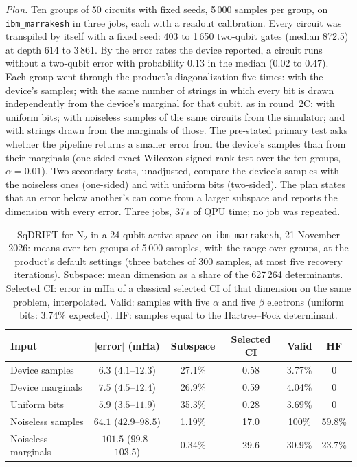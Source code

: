 \documentclass[11pt,a4paper]{article}
\begin{document}
\emph{Plan.} Ten groups of 50 circuits with fixed seeds, 5\,000 samples per
group, on \texttt{ibm\_marrakesh} in three jobs, each with a readout
calibration. Every circuit was transpiled by itself with a fixed seed: 403
to 1\,650 two-qubit gates (median 872.5) at depth 614 to 3\,861. By the error
rates the device reported, a circuit runs without a two-qubit error with
probability $0.13$ in the median ($0.02$ to $0.47$). Each group went
through the product's diagonalization five times: with the device's samples;
with the same number of strings in which every bit is drawn independently
from the device's marginal for that qubit, as in round~2C; with uniform
bits; with noiseless samples of the same circuits from the simulator; and
with strings drawn from the marginals of those. The pre-stated primary test
asks whether the pipeline returns a smaller error from the device's samples
than from their marginals (one-sided exact Wilcoxon signed-rank test over
the ten groups, $\alpha = 0.01$). Two secondary tests, unadjusted, compare
the device's samples with the noiseless ones (one-sided) and with uniform
bits (two-sided). The plan states that an error below another's can come
from a larger subspace and reports the dimension with every error. Three
jobs, 37\,s of QPU time; no job was repeated.

\begin{table}[H]
\centering\footnotesize\setlength{\tabcolsep}{5pt}
\begin{tabular}{lccccc}
\toprule
Input & $|$error$|$ (mHa) & Subspace & Selected CI & Valid & HF \\
\midrule
Device samples & $6.3$ ($4.1$--$12.3$) & 27.1\% & 0.58 & 3.77\% & 0 \\
Device marginals & $7.5$ ($4.5$--$12.4$) & 26.9\% & 0.59 & 4.04\% & 0 \\
Uniform bits & $5.9$ ($3.5$--$11.9$) & 35.3\% & 0.28 & 3.69\% & 0 \\
Noiseless samples & $64.1$ ($42.9$--$98.5$) & 1.19\% & 17.0 & 100\% & 59.8\% \\
Noiseless marginals & $101.5$ ($99.8$--$103.5$) & 0.34\% & 29.6 & 30.9\% & 23.7\% \\
\bottomrule
\end{tabular}
\caption{SqDRIFT for N$_2$ in a 24-qubit active space on
\texttt{ibm\_marrakesh}, 21 November 2026: means over ten groups of 5\,000
samples, with the range over groups, at the product's default settings
(three batches of 300 samples, at most five recovery iterations). Subspace:
mean dimension as a share of the 627\,264 determinants. Selected CI: error
in mHa of a classical selected CI of that dimension on the same problem,
interpolated. Valid: samples with five $\alpha$ and five $\beta$ electrons
(uniform bits: 3.74\% expected). HF: samples equal to the Hartree--Fock
determinant.}
\label{tab:hw-sqd24}
\end{table}
\end{document}
